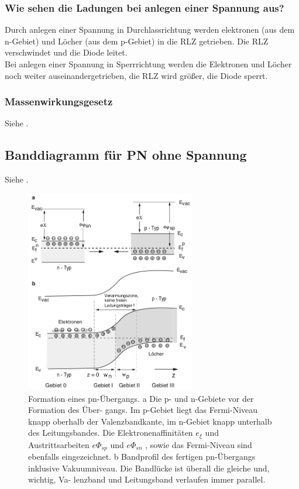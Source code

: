     \subsubsection{Wie sehen die Ladungen bei anlegen einer Spannung aus?}
    Durch anlegen einer Spannung in Durchlassrichtung werden elektronen (aus dem n-Gebiet) und L\"ocher (aus dem p-Gebiet) in die RLZ getrieben. Die RLZ verschwindet und die Diode leitet.\\
    Bei anlegen einer Spannung in Sperrrichtung werden die Elektronen und L\"ocher noch weiter auseinandergetrieben, die RLZ wird gr\"o{\ss}er, die Diode sperrt.
    \subsubsection{Massenwirkungsgesetz}
    Siehe .

\subsection{Banddiagramm für PN ohne Spannung }\label{k5:pnBand}
Siehe .
\begin{figure}[H]
    \centering
    \includegraphics[width=0.66\textwidth]{fig/pn-bandstruktur.jpg}
    \caption{Formation eines pn-Übergangs. a Die p- und n-Gebiete vor der Formation des Über-
gangs. Im p-Gebiet liegt das Fermi-Niveau knapp oberhalb der Valenzbandkante, im n-Gebiet
knapp unterhalb des Leitungsbandes. Die Elektronenaffinitäten $e_\xi$ und Austrittsarbeiten $e\Phi_{sp}$
und $e\Phi_{sn}$ , sowie das Fermi-Niveau sind ebenfalls eingezeichnet. b Bandprofil des fertigen
pn-Übergangs inklusive Vakuumniveau. Die Bandlücke ist überall die gleiche und, wichtig, Va-
lenzband und Leitungsband verlaufen immer parallel.}
    \label{fig:pn-banddiagramm}
\end{figure}

